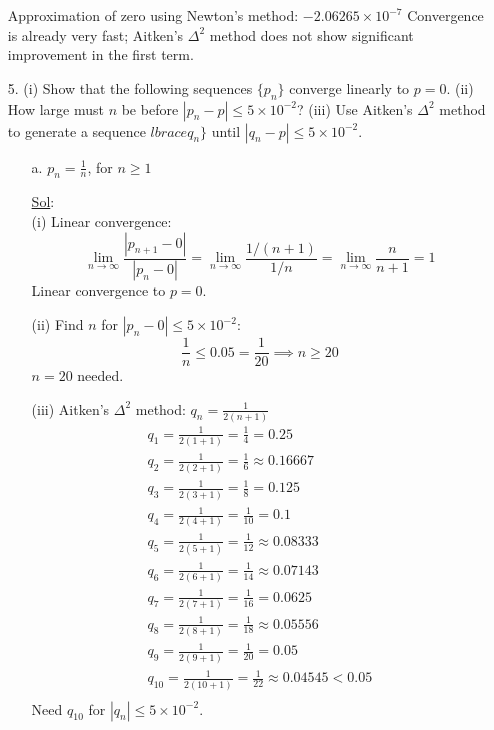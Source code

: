 \begin{enumerate}
    Approximation of zero using Newton's method: \( \boxed{-2.06265
    \times 10^{-7}} \) Convergence is already very fast; Aitken's \(
    \Delta^2 \) method does not show significant improvement in the first term.

  \item[5.] (i) Show that the following sequences \( \lbrace p_n
    \rbrace \) converge linearly to \( p = 0 \). (ii) How large must
    \(n\) be before \( |p_n - p| \le 5 \times 10^{-2} \)? (iii) Use
    Aitken's \(\Delta^2\) method to generate a sequence \(
    lbrace q_n \rbrace\) until \( |q_n - p| \le 5 \times 10^{-2} \).
    \begin{enumerate}
      \item[a.] \( p_n = \frac{1}{n} \), for \( n \ge 1 \)

        \underline{Sol}:\\

        (i) Linear convergence:
        \[
          \lim_{n \to \infty} \frac{|p_{n+1} - 0|}{|p_n - 0|} =
          \lim_{n \to \infty} \frac{1/(n+1)}{1/n} = \lim_{n \to
          \infty} \frac{n}{n+1} = 1
        \]
        Linear convergence to \( p=0 \).

        (ii) Find \( n \) for \( |p_n - 0| \le 5 \times 10^{-2} \):
        \[
          \frac{1}{n} \le 0.05 = \frac{1}{20} \implies n \ge 20
        \]
        \( n = 20 \) needed.

        (iii) Aitken's \( \Delta^2 \) method: \( q_n = \frac{1}{2(n+1)} \)
        \[
          \begin{array}{l}
            q_1 = \frac{1}{2(1+1)} = \frac{1}{4} = 0.25 \\
            q_2 = \frac{1}{2(2+1)} = \frac{1}{6} \approx 0.16667 \\
            q_3 = \frac{1}{2(3+1)} = \frac{1}{8} = 0.125 \\
            q_4 = \frac{1}{2(4+1)} = \frac{1}{10} = 0.1 \\
            q_5 = \frac{1}{2(5+1)} = \frac{1}{12} \approx 0.08333 \\
            q_6 = \frac{1}{2(6+1)} = \frac{1}{14} \approx 0.07143 \\
            q_7 = \frac{1}{2(7+1)} = \frac{1}{16} = 0.0625 \\
            q_8 = \frac{1}{2(8+1)} = \frac{1}{18} \approx 0.05556 \\
            q_9 = \frac{1}{2(9+1)} = \frac{1}{20} = 0.05 \\
            q_{10} = \frac{1}{2(10+1)} = \frac{1}{22} \approx 0.04545 < 0.05 \\
          \end{array}
        \]
        Need \( q_{10} \) for \( |q_n| \le 5 \times 10^{-2} \).



\end{enumerate}
\end{enumerate}
